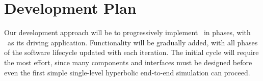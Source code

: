 \documentclass[10pt,twocolumn]{article}
\begin{document}

\section{Development Plan} \label{s:plan}




Our development approach will be to progressively implement \cello\ in
phases, with \enzoii\ as its driving application.  Functionality will
be gradually added, with all phases of the software lifecycle updated
with each iteration.  The initial cycle will require the most effort,
since many components and interfaces must be designed before even the
first simple single-level hyperbolic end-to-end simulation can
proceed.
\end{document}
